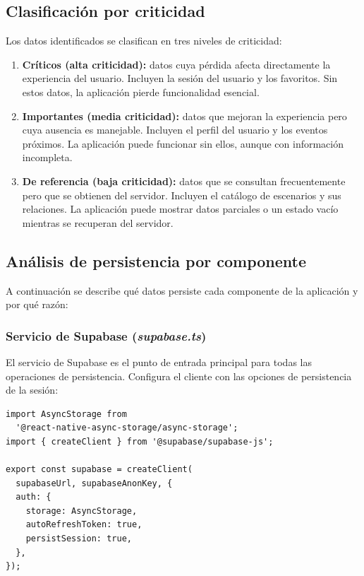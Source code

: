 \subsection{Clasificaci\'on por criticidad}

Los datos identificados se clasifican en tres niveles de criticidad:

\begin{enumerate}
  \item \textbf{Cr\'iticos (alta criticidad):} datos cuya p\'erdida afecta
    directamente la experiencia del usuario. Incluyen la sesi\'on del usuario
    y los favoritos. Sin estos datos, la aplicaci\'on pierde funcionalidad
    esencial.

  \item \textbf{Importantes (media criticidad):} datos que mejoran la
    experiencia pero cuya ausencia es manejable. Incluyen el perfil del
    usuario y los eventos pr\'oximos. La aplicaci\'on puede funcionar sin
    ellos, aunque con informaci\'on incompleta.

  \item \textbf{De referencia (baja criticidad):} datos que se consultan
    frecuentemente pero que se obtienen del servidor. Incluyen el cat\'alogo
    de escenarios y sus relaciones. La aplicaci\'on puede mostrar datos
    parciales o un estado vac\'io mientras se recuperan del servidor.
\end{enumerate}

\subsection{An\'alisis de persistencia por componente}

A continuaci\'on se describe qu\'e datos persiste cada componente de la
aplicaci\'on y por qu\'e raz\'on:

\subsubsection{Servicio de Supabase (\textit{supabase.ts})}

El servicio de Supabase es el punto de entrada principal para todas las
operaciones de persistencia. Configura el cliente con las opciones de
persistencia de la sesi\'on:

\begin{lstlisting}
import AsyncStorage from
  '@react-native-async-storage/async-storage';
import { createClient } from '@supabase/supabase-js';

export const supabase = createClient(
  supabaseUrl, supabaseAnonKey, {
  auth: {
    storage: AsyncStorage,
    autoRefreshToken: true,
    persistSession: true,
  },
});
\end{lstlisting}

